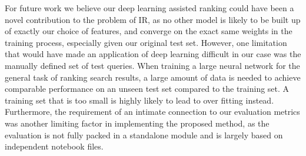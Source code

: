 For future work we believe our deep learning assisted ranking could have been a novel contribution to the problem of IR, as no other model is likely to be built up of exactly our choice of features, and converge on the exact same weights in the training process, especially given our original test set. However, one limitation that would have made an application of deep learning difficult in our case was the manually defined set of test queries. When training a large neural network for the general task of ranking search results, a large amount of data is needed to achieve comparable performance on an unseen test set compared to the training set. A training set that is too small is highly likely to lead to over fitting instead. Furthermore, the requirement of an intimate connection to our evaluation metrics was another limiting factor in implementing the proposed method, as the evaluation is not fully packed in a standalone module and is largely based on independent notebook files.





